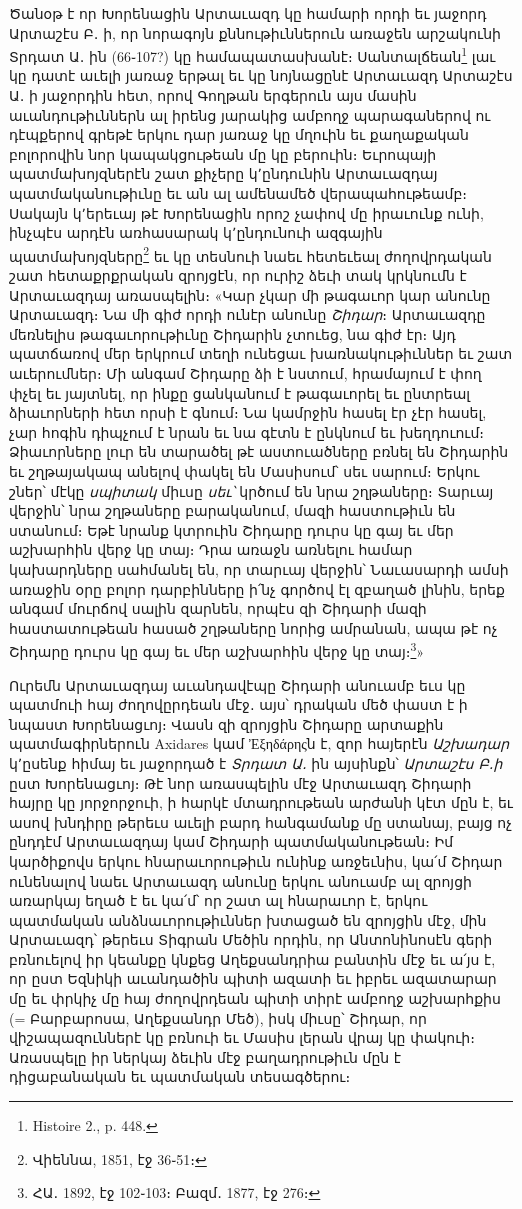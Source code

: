 \documentclass{article}
\begin{document}
{Ծանօթ է որ Խորենացին Արտաւազդ կը համարի որդի եւ յաջորդ Արտաշէս Բ․ ի, որ նորագոյն քննութիւններուն առաջեն արշակունի Տրդատ Ա․ ին (66֊107?) կը համապատասխանէ։ Սանտալճեան\footnote{Histoire 2., p. 448.} լաւ կը դատէ աւելի յառաջ երթալ եւ կը նոյնացընէ Արտաւազդ Արտաշէս Ա․ ի յաջորդին հետ, որով Գողթան երգերուն այս մասին աւանդութիւններն ալ իրենց յարակից ամբողջ պարագաներով ու դէպքերով գրեթէ երկու դար յառաջ կը մղուին եւ քաղաքական բոլորովին նոր կապակցութեան մը կը բերուին։ Եւրոպայի պատմախոյզներէն շատ քիչերը կ՚ընդունին Արտաւազդայ պատմականութիւնը եւ ան ալ ամենամեծ վերապահութեամբ։ Սակայն կ՚երեւայ թէ Խորենացին որոշ չափով մը իրաւունք ունի, ինչպէս արդէն առհասարակ կ՚ընդունուի ազգային պատմախոյզները\footnote{Վիեննա, 1851, էջ 36֊51։} եւ կը տեսնուի նաեւ հետեւեալ ժողովրդական շատ հետաքրքրական զրոյցէն, որ ուրիշ ձեւի տակ կրկնումն է Արտաւազդայ առասպելին։ «Կար չկար մի թագաւոր կար անունը Արտաւազդ։ Նա մի գիժ որդի ունէր անունը \emph{Շիդար}։ Արտաւազդը մեռնելիս թագաւորութիւնը Շիդարին չտուեց, նա գիժ էր։ Այդ պատճառով մեր երկրում տեղի ունեցաւ խառնակութիւններ եւ շատ աւերումներ։ Մի անգամ Շիդարը ձի է նստում, հրամայում է փող փչել եւ յայտնել, որ ինքը ցանկանում է թագաւորել եւ ընտրեալ ձիաւորների հետ որսի է գնում։ Նա կամրջին հասել էր չէր հասել, չար հոգին դիպչում է նրան եւ նա գէտն է ընկնում եւ խեղդուում։ Ձիաւորները լուր են տարածել թէ աստուածները բռնել են Շիդարին եւ շղթայակապ անելով փակել են Մասիսում՝ սեւ սարում։ Երկու շներ՝ մէկը \emph{սպիտակ} միւսը \emph{սեւ՝} կրծում են նրա շղթաները։ Տարւայ վերջին՝ նրա շղթաները բարականում, մազի հաստութիւն են ստանում։ Եթէ նրանք կտրուին Շիդարը դուրս կը գայ եւ մեր աշխարհին վերջ կը տայ։ Դրա առաջն առնելու համար կախարդները սահմանել են, որ տարւայ վերջին՝ Նաւասարդի ամսի առաջին օրը բոլոր դարբինները ի՛նչ գործով էլ զբաղած լինին, երեք անգամ մուրճով սալին զարնեն, որպէս զի Շիդարի մազի հաստատութեան հասած շղթաները նորից ամրանան, ապա թէ ոչ Շիդարը դուրս կը գայ եւ մեր աշխարհին վերջ կը տայ։\footnote{ՀԱ․ 1892, էջ 102֊103։ Բազմ․ 1877, էջ 276։}»

Ուրեմն Արտաւազդայ աւանդավէպը Շիդարի անուամբ եւս կը պատմուի հայ ժողովըրդեան մէջ․ այս՝ դրական մեծ փաստ է ի նպաստ Խորենացւոյ։ Վասն զի զրոյցին Շիդարը արտաքին պատմագիրներուն Axidares կամ Ἐξηδάρηςն է, զոր հայերէն \emph{Աշխադար} կ՚ըսենք հիմայ եւ յաջորդած է \emph{Տրդատ Ա․} ին այսինքն՝ \emph{Արտաշէս Բ․ի} ըստ Խորենացւոյ։ Թէ նոր առասպելին մէջ Արտաւազդ Շիդարի հայրը կը յորջորջուի, ի հարկէ մտադրութեան արժանի կէտ մըն է, եւ ասով խնդիրը թերեւս աւելի բարդ հանգամանք մը ստանայ, բայց ոչ ընդդէմ Արտաւազդայ կամ Շիդարի պատմականութեան։ Իմ կարծիքովս երկու հնարաւորութիւն ունինք առջեւնիս, կա՛մ Շիդար ունենալով նաեւ Արտաւազդ անունը երկու անուամբ ալ զրոյցի առարկայ եղած է եւ կա՛մ՝ որ շատ ալ հնարաւոր է, երկու պատմական անձնաւորութիւններ խտացած են զրոյցին մէջ, մին Արտաւազդ՝ թերեւս Տիգրան Մեծին որդին, որ Անտոնինոսէն գերի բռնուելով իր կեանքը կնքեց Աղեքսանդրիա բանտին մէջ եւ ա՛յս է, որ ըստ Եզնիկի աւանդածին պիտի ազատի եւ իբրեւ ազատարար մը եւ փրկիչ մը հայ ժողովրդեան պիտի տիրէ ամբողջ աշխարհքիս (= Բարբարոսա, Աղեքսանդր Մեծ), իսկ միւսը՝ Շիդար, որ վիշապազուններէ կը բռնուի եւ Մասիս լերան վրայ կը փակուի։ Առասպելը իր ներկայ ձեւին մէջ բաղադրութիւն մըն է դիցաբանական եւ պատմական տեսագծերու։

}
\end{document}
